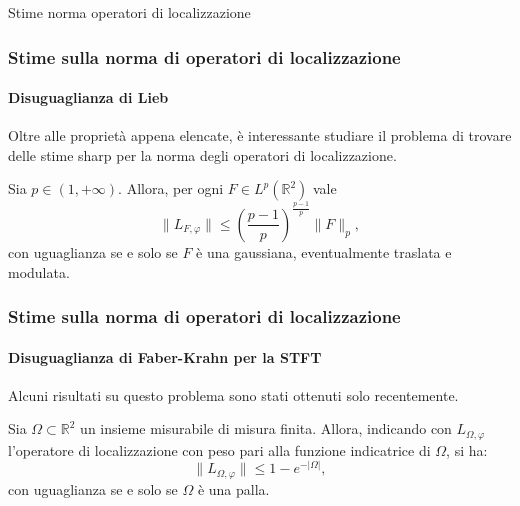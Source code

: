 \documentclass[aspectratio=141]{beamer}
\newcommand{\R}{\mathbb{R}} %
\newcommand{\V}{\mathcal{V}} %
\newcommand{\C}{\mathbb{C}} %
\begin{document}
\begin{section}{Stime norma operatori di localizzazione}
	
	\begin{frame}
		\frametitle{Stime sulla norma di operatori di localizzazione}
		\framesubtitle{Disuguaglianza di Lieb}
		Oltre alle proprietà appena elencate, è interessante studiare il problema di trovare delle stime sharp per la norma degli operatori di localizzazione.
		\pause
		\begin{myblock}
			Sia $p \in (1,+\infty)$. Allora, per ogni $F \in L^p(\R^2)$ vale
			\begin{equation}\label{stima Lieb}
				\|L_{F,\varphi}\| \leq \left(\dfrac{p-1}{p}\right)^{\frac{p-1}{p}} \|F\|_p,
			\end{equation}
			con uguaglianza se e solo se $F$ è una gaussiana, eventualmente traslata e modulata.
		\end{myblock}
	\end{frame}

	\begin{frame}
		\frametitle{Stime sulla norma di operatori di localizzazione}
		\framesubtitle{Disuguaglianza di Faber-Krahn per la STFT}
		Alcuni risultati su questo problema sono stati ottenuti solo recentemente.
		\begin{myblock}
			Sia $\Omega \subset \R^2$ un insieme misurabile di misura finita. Allora, indicando con $L_{\Omega, \varphi}$ l'operatore di localizzazione con peso pari alla funzione indicatrice di $\Omega$, si ha:
			\begin{equation*}
				\|L_{\Omega, \varphi}\| \leq 1 - e^{- |\Omega|},
			\end{equation*}
			con uguaglianza se e solo se $\Omega$ è una palla.
		\end{myblock}
	\end{frame}
	
	\begin{comment}
	\begin{frame}
		\frametitle{Stime sulla norma di operatori di localizzazione}
		\framesubtitle{Disuguaglianza di Faber-Krahn per la STFT}
		Recentemente, il seguente risultato è stato ottenuto in [Nicola e Tilli 2022].
		\begin{myblock}[Disuguaglianza di Faber-Krahn per la STFT]
			Dato $\Omega \subset \R^2$ misurabile di misura finita si ha
			\begin{equation}\label{faber-krahn stft}
				\int_{\Omega} |\V_{\varphi} f (x, \omega)|^2 \, dx \, d\omega \leq ( 1 - e^{-|\Omega|}) \int_{\R^2} |\V_{\varphi} f (x, \omega)|^2\,dx\,d\omega,
			\end{equation}
			con uguaglianza se e solo se $\Omega$ è una palla di centro $(x_0, \omega_0) \in \R^2$ e $f$ è una gaussiana traslata e modulata, ovvero $f = c M_{\omega_0} T_{x_0} \varphi$ con $c \in \C \setminus \{0\}$.
		\end{myblock}
	\end{frame}


\end{comment}
\end{section}
\end{document}
